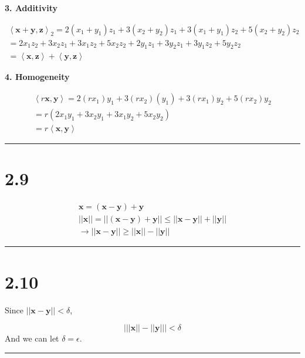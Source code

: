 \documentclass[
  12pt,
]{article}
\begin{document}
\textbf{3. Additivity}

\[
\begin{aligned}
\left<\mathbf{x}+\mathbf{y}, \mathbf{z}\right>_2 = 2(x_1 + y_1) z_1 + 3(x_2 + y_2)z_1 + 3(x_1 + y_1)z_2 + 5(x_2 + y_2)z_2 \\
= 2x_1 z_2 + 3x_2 z_1 + 3x_1 z_2 + 5x_2 z_2 + 2y_1 z_1 + 3y_2 z_1 + 3y_1 z_2 + 5y_2 z_2 \\
= \left<\mathbf{x}, \mathbf{z}\right> + \left<\mathbf{y}, \mathbf{z}\right>
\end{aligned}
\]

\textbf{4. Homogeneity}

\[
\begin{aligned}
\left<r\mathbf{x}, \mathbf{y}\right> = 2(rx_1)y_1 + 3(rx_2)(y_1) + 3(rx_1)y_2 + 5(rx_2)y_2 \\
= r(2x_1 y_1 + 3x_2 y_1 + 3x_1 y_2 + 5x_2 y_2) \\
= r \left<\mathbf{x}, \mathbf{y}\right>
\end{aligned}
\]

\begin{center}\rule{0.5\linewidth}{0.5pt}\end{center}

\chapter{2.9}\label{section-1}

\[
\begin{aligned}
\mathbf{x}= (\mathbf{x}- \mathbf{y}) + \mathbf{y}\\
||\mathbf{x}|| = ||(\mathbf{x}- \mathbf{y}) + \mathbf{y}|| \leq ||\mathbf{x}- \mathbf{y}|| + ||\mathbf{y}|| \\
\rightarrow ||\mathbf{x}- \mathbf{y}|| \geq ||\mathbf{x}|| - ||\mathbf{y}||
\end{aligned}
\]

\begin{center}\rule{0.5\linewidth}{0.5pt}\end{center}

\chapter{2.10}\label{section-2}

Since \(||\mathbf{x}- \mathbf{y}|| < \delta\),

\[
\left| ||\mathbf{x}|| - ||\mathbf{y}|| \right| < \delta
\] And we can let \(\delta = \epsilon\).

\begin{center}\rule{0.5\linewidth}{0.5pt}\end{center}
\end{document}
